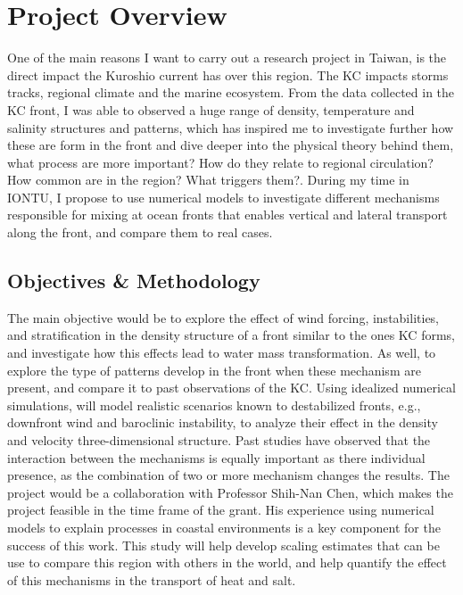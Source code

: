 \documentclass[letterpaper, 12pt ]{article}
\begin{document}
\section*{Project Overview}
% 
One of the main reasons I want to carry out a research project in Taiwan, is the direct impact the Kuroshio current has over this region. The KC impacts storms tracks, regional climate and the marine ecosystem. From the data collected in the KC front, I was able to observed a huge range of density, temperature and salinity structures and patterns, which has inspired me to investigate further how these are form in the front and dive deeper into the physical theory behind them, what process are more important? How do they relate to regional circulation? How common are in the region? What triggers them?. During my time in IONTU, I propose to use numerical models to investigate different mechanisms responsible for mixing at ocean fronts that enables vertical and lateral transport along the front, and compare them to real cases. 

 \subsection*{Objectives \& Methodology}
 
The main objective would be to explore the effect of wind forcing, instabilities, and stratification in the density structure of a front similar to the ones KC forms, and investigate how this effects lead to water mass transformation. As well, to explore the type of patterns develop in the front when these mechanism are present, and compare it to past observations of the KC. Using  idealized numerical simulations, will model realistic scenarios known to destabilized fronts,  e.g., downfront wind and baroclinic instability, to analyze their effect in the density and velocity three-dimensional structure. Past studies have observed that the interaction between the mechanisms is equally important as there individual presence, as the combination of two or more mechanism changes the results. The project would be a collaboration with Professor Shih-Nan Chen, which makes the project feasible in the time frame of the grant. His experience using numerical models to explain processes in coastal environments is a key component for the success of this work. This study will help develop scaling estimates that can be use to compare this region with others in the world, and help quantify the effect of this mechanisms in the transport of heat and salt. 
\end{document}
